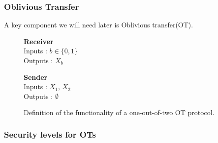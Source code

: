 \documentclass{beamer}
\begin{document}
	\begin{frame}
		\frametitle{Oblivious Transfer}
		A key component we will need later is Oblivious transfer(OT).\\
      
		\begin{figure}[!htb]
			\begin{mdframed}
				\centering
				\begin{minipage}{0.45\textwidth}
					\centering
					\textbf{Receiver}\\
					Inputs : $b \in \{0, 1\}$\\
					Outputs : $X_b$\\
				\end{minipage}
				\begin{minipage}{0.45\textwidth}
					\centering
					\textbf{Sender}\\
					Inputs : $X_1$, $X_2$\\
					Outputs : $\emptyset$\\
				\end{minipage}

			\end{mdframed}
			\caption{ Definition of the functionality of a one-out-of-two OT protocol.\label{fig:OTformalDef}}
		\end{figure}

	\end{frame}
	
	\begin{frame}
		\frametitle{Security levels for OTs}
	\end{frame}
\end{document}
